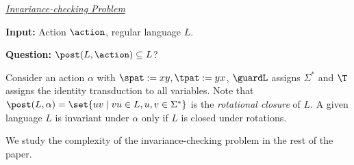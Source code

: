 \uline{\emph{Invariance-checking Problem}}

\textbf{Input:} Action $\action$, regular language $L$.

\textbf{Question:} $\post(L, \action) \subseteq L$?

\begin{example}
	Consider an action $\alpha$  with $\spat := xy, \tpat := yx$, $\guardL$ assigns $\Sigma^*$  and $\T$ assigns the identity transduction
	to all variables. Note that $\post(L,\alpha)=\set{uv \mid vu \in L, u, v \in \Sigma^*}$ is the \emph{rotational closure} of $L$. A
	given language $L$ is invariant under $\alpha$ only if $L$ is closed under rotations.
\end{example}

We study the complexity of the invariance-checking problem in the rest of the paper.
